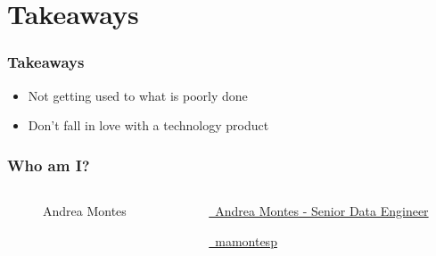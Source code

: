 \documentclass{beamer}
\begin{document}
\section {Takeaways}
\begin{frame}
    \frametitle{Takeaways}
    \begin{itemize}
        \item Not getting used to what is poorly done
        \item Don't fall in love with a technology product
    \end{itemize}
\end{frame}

\begin{frame}
    \frametitle{Who am I?}
    \begin{columns}
        \begin{column}{0.5\textwidth}
        \begin{figure}
        \caption{Andrea Montes}
        \end{figure}
        \end{column}

        \begin{column}{0.5\textwidth}
         \href{https://www.linkedin.com/in/mamontesp}{\faLinkedin \ Andrea Montes - Senior Data Engineer}
         
         \smallskip
         
         \href{https://github.com/mamontesp}{\faGithub \ mamontesp}

        \end{column}
    \end{columns}
\end{frame}
\end{document}
